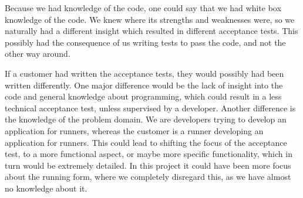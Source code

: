 Because we had knowledge of the code, one could say that we had white box knowledge of the code.
We knew where its strengths and weaknesses were, so we naturally had a different insight which resulted in different acceptance tests.
This possibly had the consequence of us writing tests to pass the code, and not the other way around. 

If a customer had written the acceptance tests, they would possibly had been written differently. One major difference would be the lack of insight into the code and general knowledge about programming, which could result in a less technical acceptance test, unless supervised by a developer.
Another difference is the knowledge of the problem domain.
We are developers trying to develop an application for runners, whereas the customer is a runner developing an application for runners.
This could lead to shifting the focus of the acceptance test, to a more functional aspect, or maybe more specific functionality, which in turn would be extremely detailed. In this project it could have been more focus about the running form, where we completely disregard this, as we have almost no knowledge about it.
